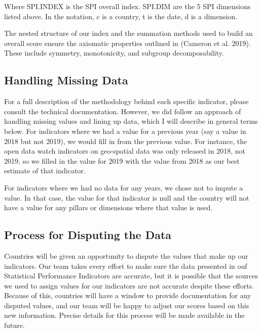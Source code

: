 \documentclass[
]{article}
\begin{document}
Where SPI.INDEX is the SPI overall index. SPI.DIM are the 5 SPI dimensions listed above. In the notation, c is a country, t is the date, d is a dimension.

The nested structure of our index and the summation methods used to build an overall score ensure the axiomatic properties outlined in (Cameron et al. 2019). These include symmetry, monotonicity, and subgroup decomposability.

\hypertarget{handling-missing-data}{%
\subsection{Handling Missing Data}\label{handling-missing-data}}

For a full description of the methodology behind each specific indicator, please consult the technical documentation. However, we did follow an approach of handling missing values and lining up data, which I will describe in general terms below. For indicators where we had a value for a previous year (say a value in 2018 but not 2019), we would fill in from the previous value. For instance, the open data watch indicators on geo-spatial data was only released in 2018, not 2019, so we filled in the value for 2019 with the value from 2018 as our best estimate of that indicator.

For indicators where we had no data for any years, we chose not to impute a value. In that case, the value for that indicator is null and the country will not have a value for any pillars or dimensions where that value is used.

\hypertarget{process-for-disputing-the-data}{%
\subsection{Process for Disputing the Data}\label{process-for-disputing-the-data}}

Countries will be given an opportunity to dispute the values that make up our indicators. Our team takes every effort to make sure the data presented in ouf Statistical Performance Indicators are accurate, but it is possible that the sources we used to assign values for our indicators are not accurate despite these efforts. Because of this, countries will have a window to provide documentation for any disputed values, and our team will be happy to adjust our scores based on this new information. Precise details for this process will be made available in the future.
\end{document}
